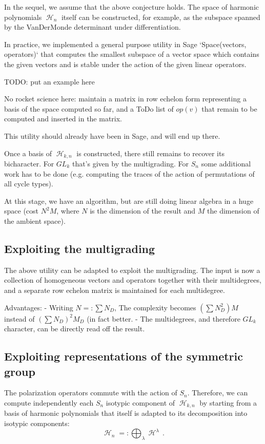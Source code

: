 \documentclass[letter,12pt]{article}
\DeclareMathOperator{\harmonics}{\mathcal{H}}
\begin{document}
	In the sequel, we assume that the above conjecture holds. The space of harmonic polynomials $\harmonics_n$ itself can be constructed, for example, as the subspace spanned by the VanDerMonde determinant under differentiation.
	
	In practice, we implemented a general purpose utility in Sage `Space(vectors, operators)` that computes the smallest subspace of a vector space which contains the given vectors and is stable under the action of the given linear operators.
	
	TODO: put an example here
	
	No rocket science here: maintain a matrix in row echelon form representing a basis of the space computed so far, and a ToDo list of $op(v)$ that remain to be computed and inserted in the matrix.
	
	This utility should already have been in Sage, and will end up there.
	
	Once a basis of $\harmonics_{k,n}$ is constructed, there still remains to recover its bicharacter. For $GL_k$ that's given by the multigrading. For $S_n$ some additional work has to be done (e.g. computing the traces of the action of permutations of all cycle types).
	
	At this stage, we have an algorithm, but are still doing linear algebra in a huge space (cost $N^2 M$, where $N$ is the dimension of the result and $M$ the dimension of the ambient space).
	
	\subsection{Exploiting the multigrading}
	
	The above utility can be adapted to exploit the multigrading. The input is now a collection of homogeneous vectors and operators together with their multidegrees, and a separate row echelon matrix is maintained for each multidegree.
	
	Advantages:
	- Writing $N=:\sum N_D$, The complexity becomes $(\sum N_D^2) M$ instead of $(\sum N_D)^2M_D$ (in fact better.
	- The multidegrees, and therefore $GL_k$ character, can be directly read off the result.
	
	\subsection{Exploiting representations of the symmetric group}
	
	The polarization operators commute with the action of $S_n$. Therefore,
	we can compute independently each $S_n$ isotypic component of $\harmonics_{k,n}$ by starting from a basis of harmonic polynomials that itself is adapted to its decomposition into isotypic components:
	$$\harmonics_{n}=:\bigoplus_\lambda \harmonics^\lambda\,.$$
	
\end{document}
